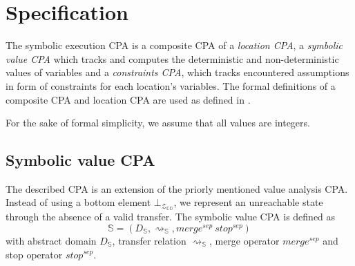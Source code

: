 \newcommand{\symex}{\mathbb{S}}

\newcommand{\constantprop}{\mathbb{CO}}
\newcommand{\constraints}{\mathbb{C}}
\newcommand{\location}{\mathbb{L}}
\newcommand{\composition}{\mathscr{C}}

\newcommand{\transfer}{\rightsquigarrow}
\newcommand{\gtransfer}{\overset{g}{\transfer}}
\newcommand{\strengthen}{\downarrow}

\newcommand{\valueset}{\mathscr{Z}}
\newcommand{\integerset}{\mathbb{Z}}

\newcommand{\symlattice}{\mathscr{E}}
\newcommand{\symidset}{S_I}
\newcommand{\symexpset}{S_E}

\newcommand{\constraintlattice}{\mathscr{C}}

\newcommand{\llbracket}{[\![}
\newcommand{\rrbracket}{]\!]}
\newcommand{\concretization}{\llbracket \cdot \rrbracket}
\newcommand{\lesserEqual}{\sqsubseteq}
\newcommand{\leastupperbound}{\sqcup}

\newcommand{\satisfies}{\vDash}

\section{Specification}
The symbolic execution CPA is a composite CPA of a \emph{location CPA}, a \emph{symbolic value CPA} which tracks and computes the deterministic and non-deterministic values of variables and a \emph{constraints CPA}, which tracks encountered assumptions in form of constraints for each location's variables. The formal definitions of a composite CPA and location CPA are used as defined in \cite{Beyer2007}.

For the sake of formal simplicity, we assume that all values are integers.

\subsection{Symbolic value CPA}
The described CPA is an extension of the priorly mentioned value analysis CPA.
Instead of using a bottom element $\bot_{\valueset_\constantprop}$, we represent an unreachable state through the absence of a valid transfer.
The symbolic value CPA is defined as
\[\symex = (D_\symex, \transfer_\symex, merge^{sep}\ stop^{sep})\]
with abstract domain $D_\symex$, transfer relation $\transfer_\symex$, merge operator $merge^{sep}$ and stop operator $stop^{sep}$.

